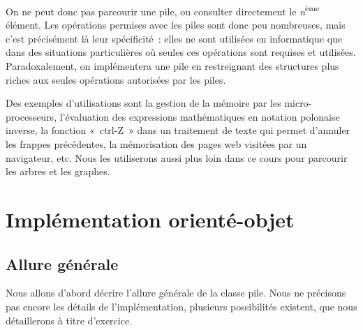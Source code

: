 	On ne peut donc pas parcourir une pile, ou consulter directement 
	le \textit{n}\textsuperscript{ème} élément. Les opérations permises
	avec les piles sont donc peu nombreuses, mais c'est précisément 
	là leur spécificité~: elles ne sont utilisées en
	informatique que dans des situations particulières où seules 
	ces opérations sont requises et utilisées. Paradoxalement,
	on implémentera une pile en restreignant des structures plus 
	riches aux seules opérations autorisées par les piles.
	
	Des exemples d'utilisations sont la gestion de la mémoire 
	par les micro-processeurs, l'évaluation des expressions
	mathématiques en notation polonaise inverse, la fonction 
	«~ctrl-Z~» dans un traitement de texte qui permet d'annuler
	les frappes précédentes, la mémorisation des pages web visitées 
	par un navigateur, etc. Nous les utiliserons aussi plus
	loin dans ce cours pour parcourir les arbres et les graphes.


\section{Implémentation orienté-objet}

	\subsection{Allure générale}
		
		Nous allons d'abord décrire l'allure générale de la 
		classe pile. Nous ne précisons pas encore les détails de
		l'implémentation, plusieurs possibilités existent, 
		que nous détaillerons à titre d'exercice.

		
